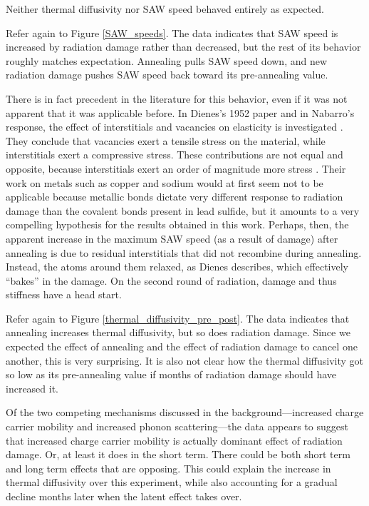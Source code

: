 Neither thermal diffusivity nor SAW speed behaved entirely as expected.

Refer again to Figure \ref{SAW_speeds}. The data indicates that SAW speed is increased by radiation damage rather than decreased, but the rest of its behavior roughly matches expectation. Annealing pulls SAW speed down, and new radiation damage pushes SAW speed back toward its pre-annealing value.

There is in fact precedent in the literature for this behavior, even if it was not apparent that it was applicable before. In Dienes's 1952 paper and in Nabarro's response, the effect of interstitials and vacancies on elasticity is investigated \cite{Dienes1952a, Nabarro1952}. They conclude that vacancies exert a tensile stress on the material, while interstitials exert a compressive stress. These contributions are not equal and opposite, because interstitials exert an order of magnitude more stress \cite{Dienes1952a}. Their work on metals such as copper and sodium would at first seem not to be applicable because metallic bonds dictate very different response to radiation damage than the covalent bonds present in lead sulfide, but it amounts to a very compelling hypothesis for the results obtained in this work. Perhaps, then, the apparent increase in the maximum SAW speed (as a result of damage) after annealing is due to residual interstitials that did not recombine during annealing. Instead, the atoms around them relaxed, as Dienes describes, which effectively ``bakes'' in the damage. On the second round of radiation, damage and thus stiffness have a head start.

Refer again to Figure  \ref{thermal_diffusivity_pre_post}. The data indicates that annealing increases thermal diffusivity, but so does radiation damage. Since we expected the effect of annealing and the effect of radiation damage to cancel one another, this is very surprising. It is also not clear how the thermal diffusivity got so low as its pre-annealing value if months of radiation damage should have increased it.

Of the two competing mechanisms discussed in the background---increased charge carrier mobility and increased phonon scattering---the data appears to suggest that increased charge carrier mobility is actually dominant effect of radiation damage. Or, at least it does in the short term. There could be both short term and long term effects that are opposing. This could explain the increase in thermal diffusivity over this experiment, while also accounting for a gradual decline months later when the latent effect takes over.


